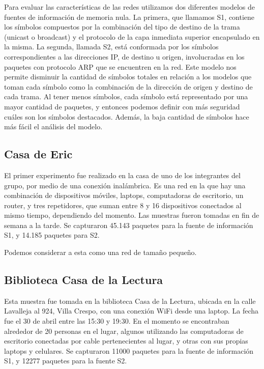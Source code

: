 
Para evaluar las características de las redes utilizamos dos diferentes modelos
de fuentes de información de memoria nula. La primera, que llamamos S1, contiene
los símbolos compuestos por la combinación del tipo de destino de la trama
(unicast o broadcast) y el protocolo de la capa inmediata superior encapsulado
en la misma. La segunda, llamada S2, está conformada por los símbolos 
correspondientes a las direcciones IP, de destino u origen, involucradas en los 
paquetes con protocolo ARP que se encuentren en la red. Este modelo
nos permite disminuir la cantidad de símbolos totales en relación a los
modelos que toman cada símbolo como la combinación de la dirección de 
origen y destino de cada trama. Al tener menos símbolos, cada símbolo
está representado por una mayor cantidad de paquetes, y entonces podemos
definir con más seguridad cuáles son los símbolos destacados. Además,
la baja cantidad de símbolos hace más fácil el análisis del modelo.

\subsection{Casa de Eric}
El primer experimento fue realizado en la casa de uno de los integrantes del grupo, por
medio de una conexión inalámbrica. Es una red en la que hay una combinación de dispositivos
móviles, laptops, computadoras de escritorio, un router, y tres repetidores, 
que suman entre 8 y 16 dispositivos conectados al mismo tiempo, dependiendo del momento.
Las muestras fueron tomadas en fin de semana a la tarde. 
Se capturaron 45.143 paquetes
para la fuente de información S1, y 14.185 paquetes para S2.

Podemos considerar a esta como una red de tamaño pequeño.

\subsection{Biblioteca Casa de la Lectura}
Esta muestra fue tomada en la biblioteca Casa de la Lectura, ubicada en
la calle Lavalleja al 924, Villa Crespo, con una conexión WiFi desde una laptop.
La fecha fue el 30 de abril entre las
15:30 y 19:30. En el momento se encontraban alrededor de 20 personas en el lugar,
algunos utilizando las computadoras de escritorio conectadas por cable
pertenecientes al lugar, y otras con sus propias laptops y celulares. 
Se capturaron 11000 paquetes para la fuente de información S1, 
y 12277 paquetes para la fuente S2.

